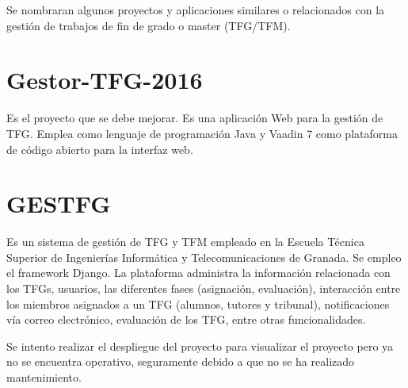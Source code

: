 Se nombraran algunos proyectos y aplicaciones similares o relacionados con la gestión de trabajos de fin de grado o master (TFG/TFM).

\section{Gestor-TFG-2016}
Es el proyecto que se debe mejorar. Es una aplicación Web para la gestión de TFG. Emplea como lenguaje de programación Java y Vaadin 7 como plataforma de código abierto para la interfaz web.

\section{GESTFG}
Es un sistema de gestión de TFG y TFM empleado en la Escuela Técnica Superior de Ingenierías Informática y Telecomunicaciones de Granada. Se empleo el framework Django. La plataforma administra la información relacionada con los TFGs, usuarios, las diferentes fases (asignación, evaluación), interacción entre los miembros asignados a un TFG (alumnos, tutores y tribunal), notificaciones vía correo electrónico, evaluación de los TFG, entre otras funcionalidades.

Se intento realizar el despliegue del proyecto para visualizar el proyecto pero ya no se encuentra operativo, seguramente debido a que no se ha realizado mantenimiento.






